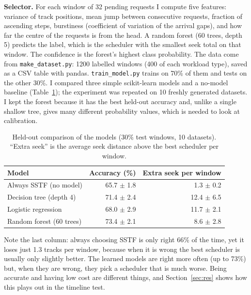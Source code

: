 \documentclass[10pt,a4paper]{article}
\begin{document}
\textbf{Selector.} For each window of 32 pending requests I compute five features: variance
of track positions, mean jump between consecutive requests, fraction of ascending steps,
burstiness (coefficient of variation of the arrival gaps), and how far the centre of the
requests is from the head. A random forest (60 trees, depth 5) predicts the label, which is
the scheduler with the smallest seek total on that window. The confidence is the forest's
highest class probability. The data come from \texttt{make\_dataset.py}: 1200 labelled windows (400 of each workload type), saved as a CSV table with pandas. \texttt{train\_model.py} trains on 70\% of them and tests on the other 30\%. I compared three simple scikit-learn models and a no-model baseline (Table~\ref{tab:models}); the experiment was repeated on 10 freshly generated datasets. I kept the forest because it has the best held-out accuracy and, unlike a single shallow tree, gives many different probability values, which is needed to look at calibration.

\begin{table}[H]
\centering\small
\caption{Held-out comparison of the models (30\% test windows, 10 datasets). ``Extra seek'' is the average seek distance above the best scheduler per window.}
\label{tab:models}
\begin{tabular}{lrr}
\toprule
Model & Accuracy (\%) & Extra seek per window \\
\midrule
Always SSTF (no model) & 65.7 $\pm$ 1.8 & 1.3 $\pm$ 0.2 \\
Decision tree (depth 4) & 71.4 $\pm$ 2.4 & 12.4 $\pm$ 6.5 \\
Logistic regression & 68.0 $\pm$ 2.9 & 11.7 $\pm$ 2.1 \\
Random forest (60 trees) & 73.4 $\pm$ 2.1 & 8.6 $\pm$ 2.8 \\
\bottomrule
\end{tabular}
\end{table}

Note the last column: always choosing SSTF is only right 66\% of the time, yet it loses just 1.3 tracks per window, because when it is wrong the best scheduler is usually only slightly better. The learned models are right more often (up to 73\%) but, when they are wrong, they pick a scheduler that is much worse. Being accurate and having low cost are different things, and Section~\ref{sec:res} shows how this plays out in the timeline test.
\end{document}
